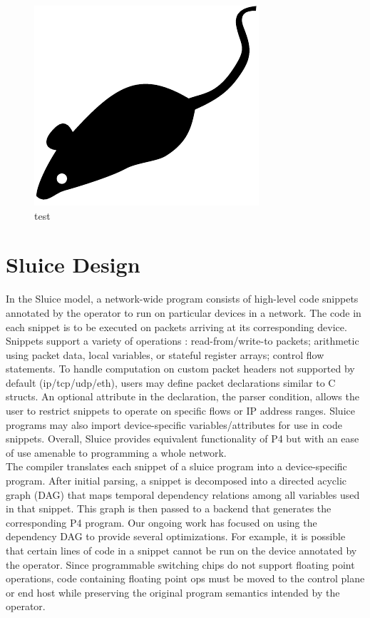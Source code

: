 \begin{figure}[tp]
\centering
\includegraphics{figures/mouse}
\caption{test}
\end{figure}

\section{Sluice Design}
In the Sluice model, a network-wide program consists of high-level code snippets annotated by the operator to run on particular devices in a network. The code in each snippet is to be executed on packets arriving at its corresponding device. Snippets support a variety of operations : read-from/write-to packets; arithmetic using packet data, local variables, or stateful register arrays; control flow statements. To handle computation on custom packet headers not supported by default (ip/tcp/udp/eth), users may define packet declarations similar to C structs. An optional attribute in the declaration, the parser condition, allows the user to restrict snippets to operate on specific flows or IP address ranges. Sluice programs may also import device-specific variables/attributes for use in code snippets. Overall, Sluice provides equivalent functionality of P4 but with an ease of use amenable to programming a whole network. \\
\indent The compiler translates each snippet of a sluice program into a device-specific program. After initial parsing, a snippet is decomposed into a directed acyclic graph (DAG) that maps temporal dependency relations among all variables used in that snippet. This graph is then passed to a backend that generates the corresponding P4 program. Our ongoing work has focused on using the dependency DAG to provide several optimizations. For example, it is possible that certain lines of code in a snippet cannot be run on the device annotated by the operator. Since programmable switching chips do not support floating point operations, code containing floating point ops must be moved to the control plane or end host while preserving the original program semantics intended by the operator. 

